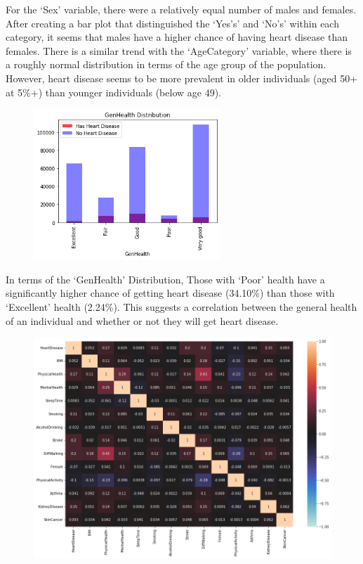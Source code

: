 \documentclass[a4paper]{article}
\begin{document}
For the ‘Sex’ variable, there were a relatively equal number of males and females. After creating a bar plot that distinguished the ‘Yes’s’ and ‘No’s’ within each category, it seems that males have a higher chance of having heart disease than females. There is a similar trend with the ‘AgeCategory’ variable, where there is a roughly normal distribution in terms of the age group of the population. However, heart disease seems to be more prevalent in older individuals (aged 50+ at 5\%+) than younger individuals (below age 49).

\begin{figure}[H]
    \centering
    \includegraphics[width=7cm]{images/genhealth.png}
\end{figure}

In terms of the ‘GenHealth’ Distribution, Those with ‘Poor’ health have a significantly higher chance of getting heart disease (34.10\%) than those with ‘Excellent’ health (2.24\%). This suggests a correlation between the general health of an individual and whether or not they will get heart disease.

\begin{figure}[H]
    \centering
    \includegraphics[width=14cm]{images/correlationmatrix.png}
\end{figure}
\end{document}
